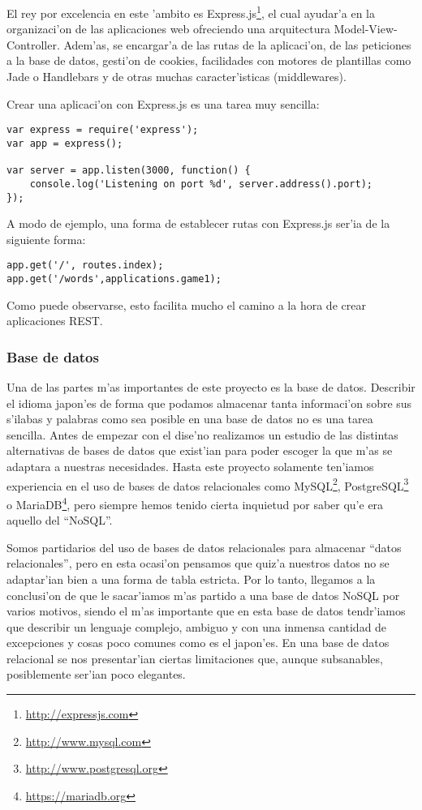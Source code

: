 El rey por excelencia en este 'ambito es Express.js\footnote{\url{http://expressjs.com}}, el cual ayudar'a en la organizaci'on de las aplicaciones web ofreciendo una arquitectura
Model-View-Controller. Adem'as, se encargar'a de las rutas de la aplicaci'on, de las peticiones a la base de datos, gesti'on de cookies,
facilidades con motores de plantillas como Jade o Handlebars y de otras muchas caracter'isticas (middlewares).

Crear una aplicaci'on con Express.js es una tarea muy sencilla:

\begin{verbatim}
var express = require('express');
var app = express();

var server = app.listen(3000, function() {
    console.log('Listening on port %d', server.address().port);
});
\end{verbatim}


A modo de ejemplo, una forma de establecer rutas con Express.js ser'ia de la siguiente forma:
\begin{verbatim}
app.get('/', routes.index);
app.get('/words',applications.game1);
\end{verbatim}

Como puede observarse, esto facilita mucho el camino a la hora de crear aplicaciones REST.

\subsubsection{Base de datos}
\label{sub:base_de_datos}
Una de las partes m'as importantes de este proyecto es la base de datos. Describir el idioma
japon'es de forma que podamos almacenar tanta informaci'on sobre sus s'ilabas y palabras
como sea posible en una base de datos no es una tarea sencilla. Antes de empezar con el dise'no
realizamos un estudio de las distintas alternativas de bases de datos que exist'ian para poder
escoger la que m'as se adaptara a nuestras necesidades. Hasta este proyecto solamente ten'iamos
experiencia en el uso de bases de datos relacionales como MySQL\footnote{\url{http://www.mysql.com}}, PostgreSQL\footnote{\url{http://www.postgresql.org}} o MariaDB\footnote{\url{https://mariadb.org}}, pero
siempre hemos tenido cierta inquietud por saber qu'e era aquello del ``NoSQL''.

Somos partidarios del uso de bases de datos relacionales
para almacenar ``datos relacionales'', pero en esta ocasi'on pensamos que quiz'a nuestros
datos no se adaptar'ian bien a una forma de tabla estricta. Por lo tanto, llegamos a la
conclusi'on de que le sacar'iamos m'as partido a una base de datos NoSQL por varios motivos,
siendo el m'as importante que en esta base de datos tendr'iamos que describir un lenguaje
complejo, ambiguo y con una inmensa cantidad de excepciones y cosas poco comunes como es
el japon'es. En una base de datos relacional se nos presentar'ian ciertas limitaciones que,
aunque subsanables, posiblemente ser'ian poco elegantes.

